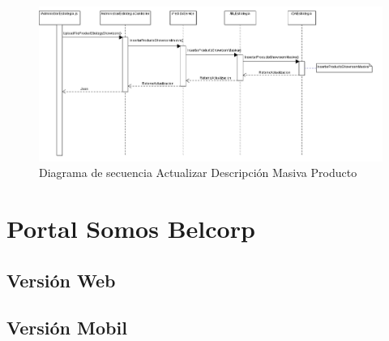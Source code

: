 \documentclass[a4paper,11pt]{paper}
\begin{document}
\newpage
\begin{landscape}
\begin{figure}[!h]
\centering
\includegraphics[width=1.5\textwidth]{imgs/Producto/InsertarMasivoProducto.png}
\caption{Diagrama de secuencia Actualizar Descripción Masiva Producto}
\end{figure}
\end{landscape} 



\newpage
\section{Portal Somos Belcorp}
\subsection{Versión Web}
\subsection{Versión Mobil}
\end{document}
